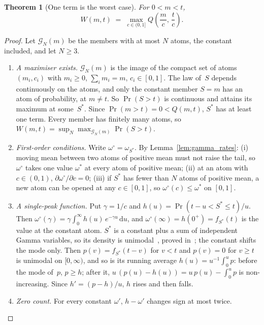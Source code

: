 \documentclass[11pt,a4paper]{article}
\theoremstyle{plain}
\newtheorem{theorem}{Theorem}[section]
\theoremstyle{definition}
\theoremstyle{remark}
\begin{document}
\begin{theorem}[One term is the worst case]\label{thm:gamma_oneterm}
For $0 < m < t$,
\[
  W(m, t) \;=\; \max_{c \in (0,1]} Q\!\left(\frac{m}{c},\, \frac{t}{c}\right).
\]
\end{theorem}
\begin{proof}
Let $\mathcal{G}_N(m)$ be the members with at most $N$ atoms, the constant included, and let $N \ge 3$.
\begin{enumerate}
  \item \emph{A maximiser exists.} $\mathcal{G}_N(m)$ is the image of the compact set of atoms $(m_i, c_i)$ with $m_i \ge 0$, $\sum_i m_i = m$, $c_i \in [0, 1]$.
    The law of~$S$ depends continuously on the atoms, and only the constant member $S = m$ has an atom of probability, at $m \ne t$.
    So $\Pr(S > t)$ is continuous and attains its maximum at some~$S^*$.
    Since $\Pr(m > t) = 0 < Q(m, t)$, $S^*$ has at least one term.
    Every member has finitely many atoms, so $W(m, t) = \sup_N \max_{\mathcal{G}_N(m)} \Pr(S > t)$.
  \item \emph{First-order conditions.} Write $\omega^\circ = \omega_{S^*}$.
    By Lemma~\ref{lem:gamma_rates}: (i) moving mean between two atoms of positive mean must not raise the tail, so $\omega^\circ$ takes one value $\omega^*$ at every atom of positive mean; (ii) at an atom with $c \in (0, 1)$, $\partial\omega^\circ/\partial c = 0$; (iii) if $S^*$ has fewer than $N$ atoms of positive mean, a new atom can be opened at any $c \in [0, 1]$, so $\omega^\circ(c) \le \omega^*$ on $[0, 1]$.
  \item \emph{A single-peak function.} Put $\gamma = 1/c$ and $h(u) = \Pr(t - u < S^* \le t)/u$.
    Then $\omega^\circ(\gamma) = \gamma\int_0^\infty h(u)\, e^{-\gamma u}\, \mathrm{d}u$, and $\omega^\circ(\infty) = h(0^+) = f_{S^*}(t)$ is the value at the constant atom.
    $S^*$ is a constant plus a sum of independent Gamma variables, so its density is unimodal~\cite[Theorem~4, p.~11]{RoostaKhorasaniSzekely2015}, proved in~\cite[proof of Theorem~4, pp.~194--195]{SzekelyBakirov2003}; the constant shifts the mode only.
    Then $p(v) = f_{S^*}(t - v)$ for $v < t$ and $p(v) = 0$ for $v \ge t$ is unimodal on $[0, \infty)$, and so is its running average $h(u) = u^{-1}\int_0^u p$: before the mode of~$p$, $p \ge h$; after it, $u\,(p(u) - h(u)) = u\,p(u) - \int_0^u p$ is non-increasing.
    Since $h' = (p - h)/u$, $h$ rises and then falls.
  \item \emph{Zero count.} For every constant $\omega'$, $h - \omega'$ changes sign at most twice.

\end{enumerate}
\end{proof}
\end{document}
